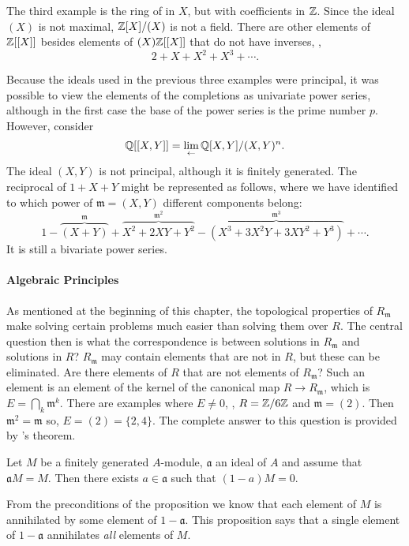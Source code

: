 {The third example is the ring of  in $X$, but with
coefficients in $\mathbb{Z}$.  Since the ideal $(X)$ is not maximal,
$\mathbb{Z}[X]/(X)$ is not a field.  There are other elements of $\mathbb{Z}[[X]]$
besides elements of $(X) \mathbb{Z}[[X]]$ that do not have inverses, \eg,
\[
2 + X + X^2 + X^3 + \cdots.
\]

Because the ideals used in the previous three examples were principal,
it was possible to view the elements of the completions as univariate
power series, although in the first case the base of the power series
is the prime number $p$.  However, consider
\[
\mathbb{Q}[[X, Y]] = \displaystyle \lim_{\leftarrow} \mathbb{Q}[X, Y]/(X, Y)^n.
\]
The ideal $(X, Y)$ is not principal, although it is finitely
generated.  The reciprocal of $1 + X + Y$ might be represented as
follows, where we have identified to which power of $\mathfrak{m} = (X,
Y)$ different components belong:
\[
1 - \overbrace{(X+Y)}^\mathfrak{m} 
  + \overbrace{X^2+2XY+ Y^2}^{\mathfrak{m}^2} 
  - \overbrace{(X^3+3X^2Y+ 3X Y^2 + Y^3)}^{\mathfrak{m}^3} + \cdots.
\]
It is still a bivariate power series.

\paragraph{Algebraic Principles}
As mentioned at the beginning of this chapter, the topological
properties of $R_\mathfrak{m}$ make solving certain problems much
easier than solving them over $R$.  The central question then is what
the correspondence is between solutions in $R_\mathfrak{m}$ and
solutions in $R$?  $R_\mathfrak{m}$ may contain elements that are not
in $R$, but these can be eliminated.  Are there elements of $R$ that
are not elements of $R_\mathfrak{m}$?  Such an element is an element
of the kernel of the canonical map $R \rightarrow R_\mathfrak{m}$,
which is $E = \bigcap_k \mathfrak{m}^k$.  There are examples where $E
\not= 0$, \eg, $R = \mathbb{Z}/6\mathbb{Z}$ and $\mathfrak{m} = (2)$.  Then
$\mathfrak{m}^2 = \mathfrak{m}$ so, $E = (2) = \{2, 4 \}$.  The
complete answer to this question is provided by {\Krull}'s
theorem.


\begin{proposition}
  Let $M$ be a finitely generated $A$-module, $\mathfrak{a}$ an ideal
  of $A$ and assume that $\mathfrak{a} M = M$.  Then there exists $a
  \in \mathfrak{a}$ such that $(1 - a)M = 0$.
\end{proposition}

From the preconditions of the proposition we know that each element of
$M$ is annihilated by some element of $1 - \mathfrak{a}$.  This
proposition says that a single element of $1 - \mathfrak{a}$
annihilates {\em all} elements of $M$.

}
